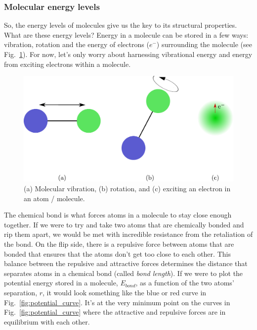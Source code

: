 \documentclass[12pt]{article}
\begin{document}
\subsubsection{Molecular energy levels}

So, the energy levels of molecules give us the key to its structural properties. What are these energy levels? Energy in a molecule can be stored in a few ways: vibration, rotation and the energy of electrons ($e^-$) surrounding the molecule (see Fig.~\ref{fig:DOFs}). For now, let's only worry about harnessing vibrational energy and energy from exciting electrons within a molecule.

\begin{figure}
    \begin{center}
        \includegraphics[width=0.5\linewidth]{figures/molecule_DOFs.pdf}
    \end{center}
    \caption{
    (a) Molecular vibration, (b) rotation, and (c) exciting an electron in an atom / molecule.
    }
    \label{fig:DOFs}
\end{figure}

The chemical bond is what forces atoms in a molecule to stay close enough together. If we were to try and take two atoms that are chemically bonded and rip them apart, we would be met with incredible resistance from the retaliation of the bond. On the flip side, there is a repulsive force between atoms that are bonded that ensures that the atoms don't get too close to each other. This balance between the repulsive and attractive forces determines the distance that separates atoms in a chemical bond (called \textit{bond length}). If we were to plot the potential energy stored in a molecule, $E_{bond}$, as a function of the two atoms' separation, $r$, it would look something like the blue or red curve in Fig.~\ref{fig:potential_curve}. It's at the very minimum point on the curves in Fig.~\ref{fig:potential_curve} where the attractive and repulsive forces are in equilibrium with each other.
\end{document}
